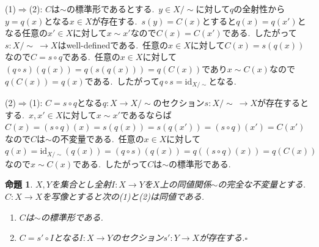 \documentclass[uplatex,dvipdfmx]{jsarticle}
\makeatletter
\theoremstyle{noperiod}
\newtheorem{proposition}{命題}
\renewenvironment{proof}[1][\proofname]{\par
  \pushQED{\qed}
  \normalfont \topsep6\p@\@plus6\p@\relax
  \trivlist
  \item[\hskip\labelsep
        \itshape
    #1 ]\ignorespaces
}{
  \popQED\endtrivlist\@endpefalse
}
\renewcommand{\proofname}{\bfseries 証明}
\makeatother
\begin{document}
\begin{proof}
(1)$\Rightarrow$(2):\; $C$は$\sim$の標準形であるとする.\ $y \in X/\sim$に対して$q$の全射性から$y = q(x)$となる$x \in X$が存在する.\ $s(y) = C(x)$とすると$q(x) = q(x')$となる任意の$x' \in X$に対して$x \sim x'$なので$C(x) = C(x')$である.\ したがって$s \colon X/\sim \ \to X$はwell-definedである.\ 任意の$x \in X$に対して$C(x) = s(q(x))$なので$C = s \circ q$である.\ 任意の$x \in X$に対して$(q \circ s)(q(x)) = q(s(q(x))) = q(C(x))$であり$x \sim C(x)$なので$q(C(x)) = q(x)$である.\ したがって$q \circ s = \mathrm{id}_{X/\sim}$となる.

(2)$\Rightarrow$(1):\; $C = s \circ q$となる$q \colon X \to X/\sim$のセクション$s \colon X/\sim\ \to X$が存在するとする.\ $x,x' \in X$に対して$x \sim x'$であるならば$C(x) = (s \circ q)(x) = s(q(x)) = s(q(x')) = (s \circ q)(x') = C(x')$なので$C$は$\sim$の不変量である.\ 任意の$x \in X$に対して$q(x) = \mathrm{id}_{X/\sim}(q(x)) = (q \circ s)(q(x)) = q((s \circ q)(x)) = q(C(x))$なので$x \sim C(x)$である.\ したがって$C$は$\sim$の標準形である.
\end{proof}

\begin{proposition}
$X,Y$を集合とし全射$I \colon X \to Y$を$X$上の同値関係$\sim$の完全な不変量とする.\ $C \colon X \to X$を写像とすると次の(1)と(2)は同値である.
\def\labelenumi{(\theenumi)}
\begin{enumerate}
  \item $C$は$\sim$の標準形である.
  \item $C = s' \circ I$となる$I \colon X \to Y$のセクション$s' \colon Y \to X$が存在する.\hfill $\square$
\end{enumerate}
\end{proposition}
\end{document}
